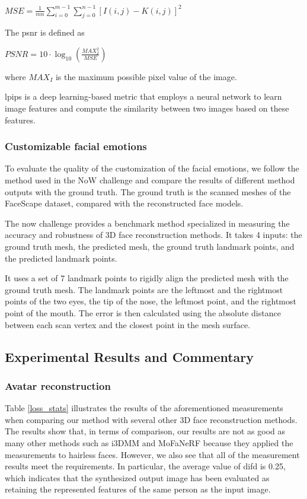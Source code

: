 $MSE = \frac{1}{mn}\sum_{i=0}^{m-1}\sum_{j=0}^{n-1}[I(i,j)-K(i,j)]^2$

The \acrshort{psnr} is defined as

$PSNR = 10\cdot\log_{10}(\frac{MAX_I^2}{MSE})$

where $MAX_{I}$ is the maximum possible pixel value of the image.

\acrshort{lpips} is a deep learning-based metric that employs a neural network to learn image features and compute the similarity between two images based on these features.

\subsubsection{Customizable facial emotions}
To evaluate the quality of the customization of the facial emotions, we follow the method used in the NoW challenge and compare the results of different method outputs with the ground truth. The ground truth is the scanned meshes of the FaceScape dataset, compared with the reconstructed face models.

The \acrshort{now} challenge \cite{RingNet:CVPR:2019} provides a benchmark method specialized in measuring the accuracy and robustness of 3D face reconstruction methods. It takes 4 inputs: the ground truth mesh, the predicted mesh, the ground truth landmark points, and the predicted landmark points.

It uses a set of 7 landmark points to rigidly align the predicted mesh with the ground truth mesh. The landmark points are the leftmost and the rightmost points of the two eyes, the tip of the nose, the leftmost point, and the rightmost point of the mouth. The error is then calculated using the absolute distance between each scan vertex and the closest point in the mesh surface.


\subsection{Experimental Results and Commentary}
\subsubsection{Avatar reconstruction}

Table \ref{loss_stats} illustrates the results of the aforementioned measurements when comparing our method with several other 3D face reconstruction methods. The results show that, in terms of comparison, our results are not as good as many other methods such as i3DMM and MoFaNeRF because they applied the measurements to hairless faces. However, we also see that all of the measurement results meet the requirements. In particular, the average value of \acrshort{difd} is 0.25, which indicates that the synthesized output image has been evaluated as retaining the represented features of the same person as the input image.

